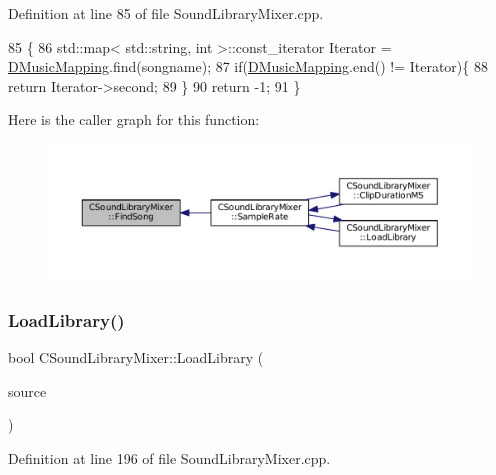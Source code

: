 Definition at line 85 of file Sound\+Library\+Mixer.\+cpp.


\begin{DoxyCode}
85                                                                \{
86     std::map< std::string, int >::const\_iterator Iterator = \hyperlink{classCSoundLibraryMixer_ada2510450315651ebe948ce63960b98a}{DMusicMapping}.find(songname);
87     \textcolor{keywordflow}{if}(\hyperlink{classCSoundLibraryMixer_ada2510450315651ebe948ce63960b98a}{DMusicMapping}.end() != Iterator)\{
88         \textcolor{keywordflow}{return} Iterator->second;
89     \}
90     \textcolor{keywordflow}{return} -1;
91 \}
\end{DoxyCode}
Here is the caller graph for this function\+:\nopagebreak
\begin{figure}[H]
\begin{center}
\leavevmode
\includegraphics[width=350pt]{classCSoundLibraryMixer_a67d0364979fab26c2b2467357ec03696_icgraph}
\end{center}
\end{figure}
\hypertarget{classCSoundLibraryMixer_a9753684f44863e3c7cc4d319370cda1d}{}\label{classCSoundLibraryMixer_a9753684f44863e3c7cc4d319370cda1d} 
\subsubsection{\texorpdfstring{Load\+Library()}{LoadLibrary()}}
{\footnotesize\ttfamily bool C\+Sound\+Library\+Mixer\+::\+Load\+Library (\begin{DoxyParamCaption}\item[{std\+::shared\+\_\+ptr$<$ \hyperlink{classCDataSource}{C\+Data\+Source} $>$}]{source }\end{DoxyParamCaption})}



Definition at line 196 of file Sound\+Library\+Mixer.\+cpp.


